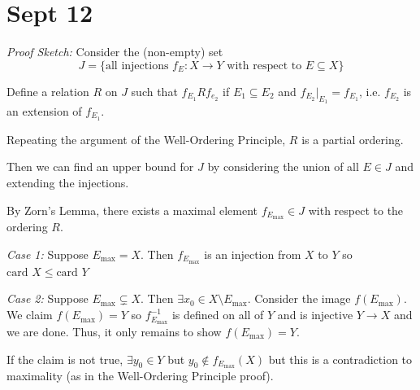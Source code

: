 \documentclass[12pt]{report}
\newcommand{\sub}{\subseteq}
\newcommand{\card}{\text{card }}
\newenvironment*{tbox}[2][gray]{
    \begin{tcolorbox}[
        parbox=false,
        colback=#1!5!white,
        colframe=#1!75!black,
        breakable,
        title={#2}
    ]}
    {\end{tcolorbox}}
\begin{document}
\section{Sept 12}
    \begin{tbox}{\textbf{Property:} For any sets $x$ and $Y$, either $\card X \leq \card Y$ or $\card Y \leq \card X$}
        \emph{Proof Sketch:} Consider the (non-empty) set 
        \[J = \{\text{all injections } f_E: X \to Y \text{ with respect to } E \sub X\}\]
        
        Define a relation $R$ on $J$ such that $f_{E_1} R f_{e_2}$ if $E_1 \sub E_2$ and $f_{E_2}\big\vert_{E_1} = f_{E_1}$, i.e. $f_{E_2}$ is an extension of $f_{E_1}$.

        Repeating the argument of the Well-Ordering Principle, $R$ is a partial ordering. 

        Then we can find an upper bound for $J$ by considering the union of all $E \in J$ and extending the injections. 

        By Zorn's Lemma, there exists a maximal element $f_{E_{\max}} \in J$ with respect to the ordering $R$. 

        \emph{Case 1:} Suppose $E_{\max} = X$. Then $f_{E_{\max}}$ is an injection from $X$ to $Y$ so $\card X \leq \card Y$  

        \emph{Case 2:} Suppose $E_{\max} \subsetneq X$. Then $\exists x_0 \in X \setminus E_{\max}$. Consider the image $f(E_{\max})$. We claim $f(E_{\max}) = Y$ so $f_{E_{\max}}^{-1}$ is defined on all of $Y$ and is injective $Y \to X$ and we are done. Thus, it only remains to show $f(E_{\max}) = Y$. 

        If the claim is not true, $\exists y_0 \in Y$ but $y_0 \notin f_{E_{\max}}(X)$ but this is a contradiction to maximality (as in the Well-Ordering Principle proof).       
    \end{tbox}
\end{document}
